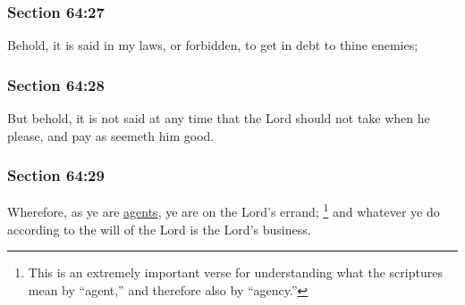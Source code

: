
	\subsubsection{Section 64:27} %
		\label{DC64-27}

		Behold, it is said in my laws, or forbidden, to get in debt to thine enemies;


	\subsubsection{Section 64:28} %
		\label{DC64-28}

		But behold, it is not said at any time that the Lord should not take when he please, and pay as seemeth him good.


	\subsubsection{Section 64:29} %
		\label{DC64-29}

		Wherefore, as ye are \hyperref[AGENCY]{agents}, ye are on the Lord's errand;%
			\footnote{%
				This is an extremely important verse for understanding what the scriptures mean by ``agent,'' and therefore also by ``agency.''
				}
		and whatever ye do according to the will of the Lord is the Lord's business.

